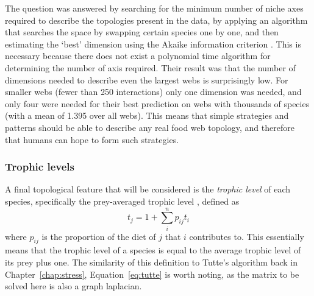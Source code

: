 The question was answered by searching for the minimum number of niche axes required to describe the topologies present in the data, by applying an algorithm that searches the space by swapping certain species one by one, and then estimating the `best' dimension using the Akaike information criterion \cite{Eklof2013}. This is necessary because there does not exist a polynomial time algorithm for determining the number of axis required.
Their result was that the number of dimensions needed to describe even the largest webs is surprisingly low. For smaller webs (fewer than 250 interactions) only one dimension was needed, and only four were needed for their best prediction on webs with thousands of species (with a mean of 1.395 over all webs).
This means that simple strategies and patterns should be able to describe any real food web topology, and therefore that humans can hope to form such strategies.

\subsubsection{Trophic levels}
A final topological feature that will be considered is the \emph{trophic level} of each species, specifically the prey-averaged trophic level \cite{Williams2004}, defined as
\begin{equation}
  t_j = 1 + \sum_i^n p_{ij}t_i
  \label{eq:trophic}
\end{equation}
where $p_{ij}$ is the proportion of the diet of $j$ that $i$ contributes to.
This essentially means that the trophic level of a species is equal to the average trophic level of its prey plus one.
The similarity of this definition to Tutte's algorithm back in Chapter~\ref{chap:stress}, Equation~\eqref{eq:tutte} is worth noting, as the matrix to be solved here is also a graph laplacian.

